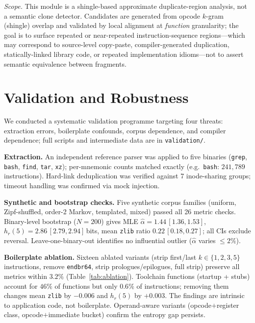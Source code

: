 \documentclass[conference]{IEEEtran}
\newcommand{\hr}[1]{h_r(#1)}
\newcommand{\zlib}{\texttt{zlib}}
\begin{document}
\emph{Scope.}  This module is a shingle-based approximate
duplicate-region analysis, not a semantic clone detector.  Candidates are
generated from opcode $k$-gram (shingle) overlap and validated by local
alignment at \emph{function} granularity; the goal is to surface repeated
or near-repeated instruction-sequence regions---which may correspond to
source-level copy-paste, compiler-generated duplication, statically-linked
library code, or repeated implementation idioms---not to assert semantic
equivalence between fragments.

\section{Validation and Robustness}
\label{sec:validation}

We conducted a systematic validation programme targeting four threats:
extraction errors, boilerplate confounds, corpus dependence, and
compiler dependence; full scripts and intermediate data are in
\texttt{validation/}.

\textbf{Extraction.}
An independent reference parser was applied to five binaries
(\texttt{grep}, \texttt{bash}, \texttt{find}, \texttt{tar},
\texttt{xz}); per-mnemonic counts matched exactly
(e.g.\ \texttt{bash}: $241{,}789$ instructions).
Hard-link deduplication was verified against 7 inode-sharing groups;
timeout handling was confirmed via mock injection.

\textbf{Synthetic and bootstrap checks.}
Five synthetic corpus families (uniform, Zipf-shuffled, order-2 Markov,
templated, mixed) passed all 26 metric checks.  Binary-level bootstrap
($N{=}200$) gives MLE $\hat{\alpha}{=}1.44\,[1.36,1.53]$,
$\hr{5}{=}2.86\,[2.79,2.94]$\,bits, mean \zlib{} ratio
$0.22\,[0.18,0.27]$; all CIs exclude reversal.  Leave-one-binary-out
identifies no influential outlier ($\hat{\alpha}$ varies ${\leq}2\%$).

\textbf{Boilerplate ablation.}
Sixteen ablated variants (strip first/last $k{\in}\{1,2,3,5\}$
instructions, remove \texttt{endbr64}, strip prologues/epilogues, full
strip) preserve all metrics within $3.2\%$ (Table~\ref{tab:ablation}).
Toolchain functions (startup + stubs) account for $46\%$ of functions
but only $0.6\%$ of instructions; removing them changes mean \zlib{}
by $-0.006$ and $\hr{5}$ by $+0.003$.  The findings are intrinsic to
application code, not boilerplate.  Operand-aware variants
(opcode$+$register class, opcode$+$immediate bucket) confirm the
entropy gap persists.
\end{document}
